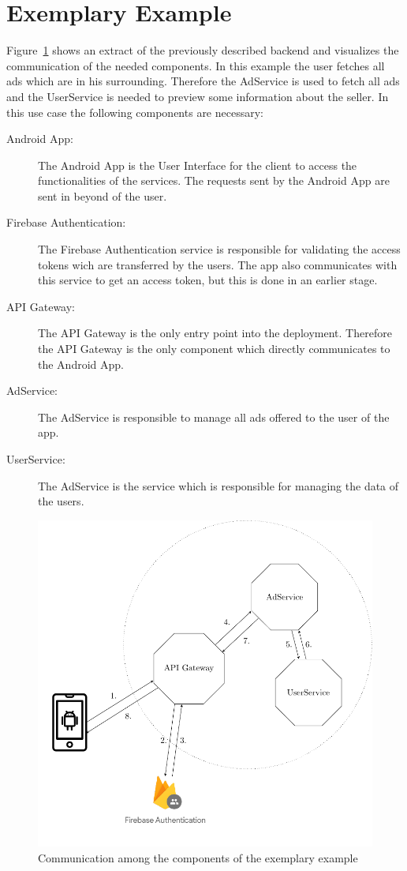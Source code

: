 \section{Exemplary Example}
Figure~\ref{fig:deployment_structure} shows an extract of the previously described backend and visualizes the communication of the needed components.
In this example the user fetches all ads which are in his surrounding.
Therefore the AdService is used to fetch all ads and the UserService is needed to preview some information about the seller.
In this use case the following components are necessary:
\begin{description}
	\item[Android App:] The Android App is the User Interface for the client to access the functionalities of the services.
		The requests sent by the Android App are sent in beyond of the user.
	\item[Firebase Authentication:] The Firebase Authentication service is responsible for validating the access tokens wich are transferred by the users.
		The app also communicates with this service to get an access token, but this is done in an earlier stage.
	\item[API Gateway:] The API Gateway is the only entry point into the deployment.
		Therefore the API Gateway is the only component which directly communicates to the Android App.
	\item[AdService:] The AdService is responsible to manage all ads offered to the user of the app.
	\item[UserService:] The AdService is the service which is responsible for managing the data of the users.
\end{description}

\begin{figure}
	\centering
	\includegraphics{images/project-structure/TikZ_structure.pdf}
	\caption{Communication among the components of the exemplary example}
	\label{fig:deployment_structure}
\end{figure}

